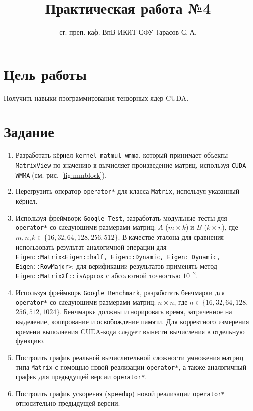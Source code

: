 \documentclass[12pt]{article}
\title{Практическая работа №4}
\author{ст. преп. каф. ВпВ ИКИТ СФУ Тарасов С. А.}
\date{}
\begin{document}
\maketitle

\section*{Цель работы}
Получить навыки программирования тензорных ядер CUDA.

\section*{Задание}
\begin{enumerate}
    \item Разработать кёрнел \texttt{kernel\_matmul\_wmma}, который принимает объекты \texttt{MatrixView} по значению и вычисляет произведение матриц, используя \texttt{CUDA WMMA} (см. рис.~\ref{fig:mmblock}).

    \item Перегрузить оператор \texttt{operator*} для класса \texttt{Matrix}, используя указанный кёрнел.

    \item Используя фреймворк \texttt{Google Test}, разработать модульные тесты для \texttt{operator*} со следующими размерами матриц: $A$ ($m \times k$) и $B$ ($k \times n$), где $m, n, k \in \{16, 32, 64, 128, 256, 512\}$. В качестве эталона для сравнения использовать результат аналогичной операции для \texttt{Eigen::Matrix<Eigen::half, Eigen::Dynamic, Eigen::Dynamic, Eigen::RowMajor>}; для верификации результатов применять метод \texttt{Eigen::MatrixXf::isApprox} с абсолютной точностью $10^{-2}$.

    \item Используя фреймворк \texttt{Google Benchmark}, разработать бенчмарки для \texttt{operator*} со следующими размерами матриц: $n \times n$, где $n \in \{16, 32, 64, 128,$ $256, 512, 1024\}$. Бенчмарки должны игнорировать время, затраченное на выделение, копирование и освобождение памяти. Для корректного измерения времени выполнения CUDA-кода следует вынести вычисления в отдельную функцию.

    \item Построить график реальной вычислительной сложности умножения матриц типа \texttt{Matrix} с помощью новой реализации \texttt{operator*}, а также аналогичный график для предыдущей версии \texttt{operator*}.

    \item Построить график ускорения (\texttt{speedup}) новой реализации \texttt{operator*} относительно предыдущей версии.


\end{enumerate}
\end{document}
